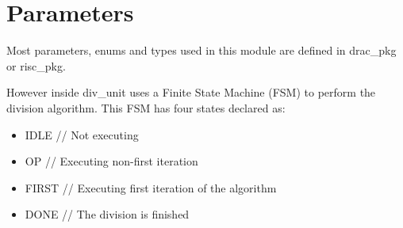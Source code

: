 \section{Parameters}
\label{chapter3}

Most parameters, enums and types used in this module are defined in drac\_pkg or risc\_pkg.

However inside div\_unit uses a Finite State Machine (FSM) to perform the division algorithm. This FSM has four states declared as:

\begin{itemize}
    \item IDLE          // Not executing
    \item OP            // Executing non-first iteration
    \item FIRST         // Executing first iteration of the algorithm
    \item DONE          // The division is finished
\end{itemize}